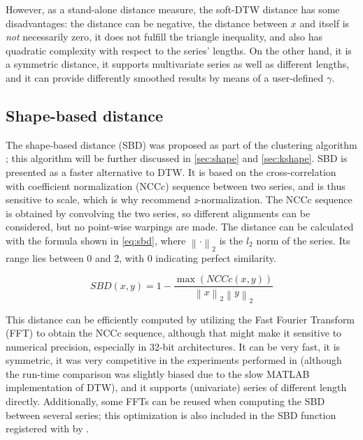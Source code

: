 However, as a stand-alone distance measure,
the soft-DTW distance has some disadvantages:
the distance can be negative,
the distance between $x$ and itself is \textit{not} necessarily zero,
it does not fulfill the triangle inequality,
and also has quadratic complexity with respect to the series' lengths.
On the other hand,
it is a symmetric distance,
it supports multivariate series as well as different lengths,
and it can provide differently smoothed results by means of a user-defined $\gamma$.

\subsection{Shape-based distance}
\label{sec:sbd}

The shape-based distance (SBD) was proposed as part of the \kshape{} clustering algorithm \citep{paparrizos2015};
this algorithm will be further discussed in \cref{sec:shape} and \cref{sec:kshape}.
SBD is presented as a faster alternative to DTW.
It is based on the cross-correlation with coefficient normalization (NCCc) sequence between two series,
and is thus sensitive to scale,
which is why \citet{paparrizos2015} recommend \textit{z}-normalization.
The NCCc sequence is obtained by convolving the two series,
so different alignments can be considered,
but no point-wise warpings are made.
The distance can be calculated with the formula shown in \cref{eq:sbd},
where $\left\lVert \cdot \right\rVert_2$ is the $l_2$ norm of the series.
Its range lies between 0 and 2, with 0 indicating perfect similarity.

\begin{equation}
\label{eq:sbd}
SBD(x,y) = 1 - \frac{\max \left( NCCc(x,y) \right)}{\left\lVert x \right\rVert_2 \left\lVert y \right\rVert_2}
\end{equation}

This distance can be efficiently computed by utilizing the Fast Fourier Transform (FFT) to obtain the NCCc sequence,
although that might make it sensitive to numerical precision,
especially in 32-bit architectures.
It can be very fast,
it is symmetric,
it was very competitive in the experiments performed in \citet{paparrizos2015}
(although the run-time comparison was slightly biased due to the slow MATLAB implementation of DTW),
and it supports (univariate) series of different length directly.
Additionally, some FFTs can be reused when computing the SBD between several series;
this optimization is also included in the SBD function registered with  by \dtwclust{}.


